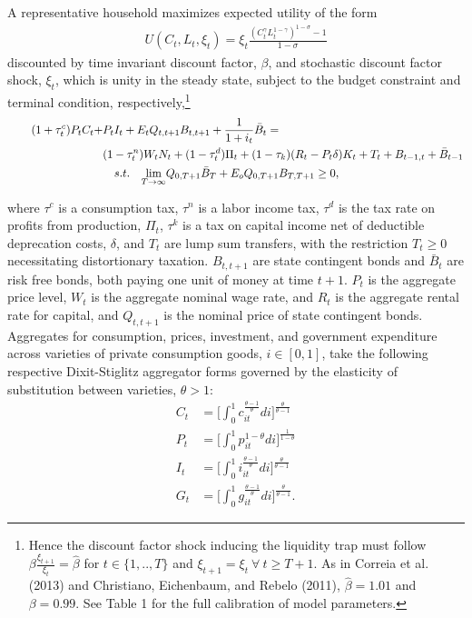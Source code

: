 \documentclass[12pt,letterpaper]{article}
\begin{document}
A representative household maximizes expected utility of the form 
\begin{align}
U(C_t, L_t, \xi_t) =  \xi_t \frac{(C_t^\gamma L_t^{1-\gamma})^{1-\sigma} - 1}{1 - \sigma}
\end{align}
\noindent discounted by time invariant discount factor, $\beta$, and stochastic discount factor shock, $\xi_t$, which is unity in the steady state, subject to the budget constraint and terminal condition, respectively,\footnote{Hence the discount factor shock inducing the liquidity trap must follow $\beta \frac{\xi_{t+1}}{\xi_t} = \hat{\beta}$ for $t \in \{1,.., T\}$ and $\xi_{t+1} = \xi_t \ \forall \ t \geq T+1$. As in Correia et al. (2013) and Christiano, Eichenbaum, and Rebelo (2011), $\hat{\beta} = 1.01$ and $\beta = 0.99$. See Table 1 for the full calibration of model parameters.}
\begin{subequations} 
\begin{align}
(1 + \tau_t^c)P_t C_t + & P_t I_{t} + E_t Q_{t,t+1} B_{t,t+1} + \frac{1}{1+i_t} \bar{B}_t =  \\ \notag
  \mspace{150mu}
 &(1 - \tau_t^n)W_t N_t + (1 - \tau^d_t) \Pi_t + (1- \tau_k) (R_t - P_t \delta)K_t  + T_t + B_{t-1,t} +  \bar{B}_{t-1} \\ 
  \mspace{150mu}
& \ \ \ s.t. \ \ \  \underset{T \rightarrow \infty}{\text{lim}} Q_{0,T+1} \bar{B}_T + E_o Q_{0,T+1} B_{T,T+1} \geq 0, 
\end{align}
\end{subequations} 

\noindent where $\tau^c$ is a consumption tax, $\tau^n$ is a labor income tax,  $\tau^d$ is the tax rate on profits from production, $\Pi_t$, $\tau^k$ is a tax on capital income net of deductible deprecation costs, $\delta$, and $T_t$ are lump sum transfers, with the restriction $T_t \geq 0$ necessitating distortionary taxation. $B_{t,t+1}$ are state contingent bonds and $\bar{B}_t$ are risk free bonds, both paying one unit of money at time $t+1$. $P_t$ is the aggregate price level, $W_t$ is the aggregate nominal wage rate, and $R_t$ is the aggregate rental rate for capital, and $Q_{t,t+1}$ is the nominal price of state contingent bonds. Aggregates for consumption, prices, investment, and government expenditure across varieties of private consumption goods, $i \in [0,1]$, take the following respective Dixit-Stiglitz aggregator forms governed by the elasticity of substitution between varieties, $\theta > 1$:
\begin{align}
C_t &= \big[ \int_0^1 c_{it}^{\frac{\theta-1}{\theta}} di \Big]^{\frac{\theta}{\theta-1}} \\
P_t &= \big[ \int_0^1 p_{it}^{1-\theta} di \Big]^{\frac{1}{1-\theta}} \\
I_t &= \big[ \int_0^1 i_{it}^{\frac{\theta-1}{\theta}} di \Big]^{\frac{\theta}{\theta-1}} \\
G_t &= \big[ \int_0^1 g_{it}^{\frac{\theta-1}{\theta}} di \Big]^{\frac{\theta}{\theta-1}}.
\end{align}
\end{document}
